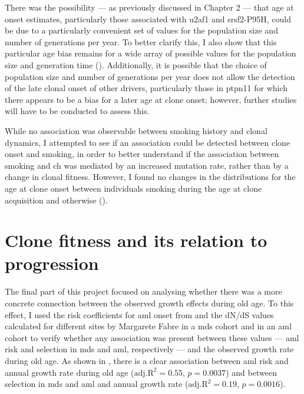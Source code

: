 There was the possibility --- as previously discussed in Chapter 2 --- that age at onset estimates, particularly those associated with \ac{u2af1} and \ac{srsf2}-P95H, could be due to a particularly convenient set of values for the population size and number of generations per year. To better clarify this, I also show that this particular age bias remains for a wide array of possible values for the population size and generation time (). Additionally, it is possible that the choice of population size and number of generations per year does not allow the detection of the late clonal onset of other drivers, particularly those in \ac{ptpn11} for which there appears to be a bias for a later age at clone onset; however, further studies will have to be conducted to assess this.

\begin{figure}[!ht]
	\label{fig:ages-at-onset-benchmark}
\end{figure}

While no association was observable between smoking history and clonal dynamics, I attempted to see if an association could be detected between clone onset and smoking, in order to better understand if the association between smoking and \ac{ch} was mediated by an increased mutation rate, rather than by a change in clonal fitness. However, I found no changes in the distributions for the age at clone onset between individuals smoking during the age at clone acquisition and otherwise ().

\begin{figure}[!ht]
	\label{fig:smoking-age-density}
\end{figure}

\section{Clone fitness and its relation to progression}

The final part of this project focused on analysing whether there was a more concrete connection between the observed growth effects during old age. To this effect, I used the risk coefficients for \ac{aml} onset from \cite{Abelson2018-wh} and the dN/dS values calculated for different sites by Margarete Fabre in a \ac{mds} cohort and in an \ac{aml} cohort to verify whether any association was present between these values --- \ac{aml} risk and selection in \ac{mds} and \ac{aml}, respectively --- and the observed growth rate during old age. As shown in , there is a clear association between \ac{aml} risk and annual growth rate during old age ($\mathrm{adj. R}^2=0.55$, $p=0.0037$) and between selection in \ac{mds} and \ac{aml} and annual growth rate ($\mathrm{adj. R}^2=0.19$, $p=0.0016$).

